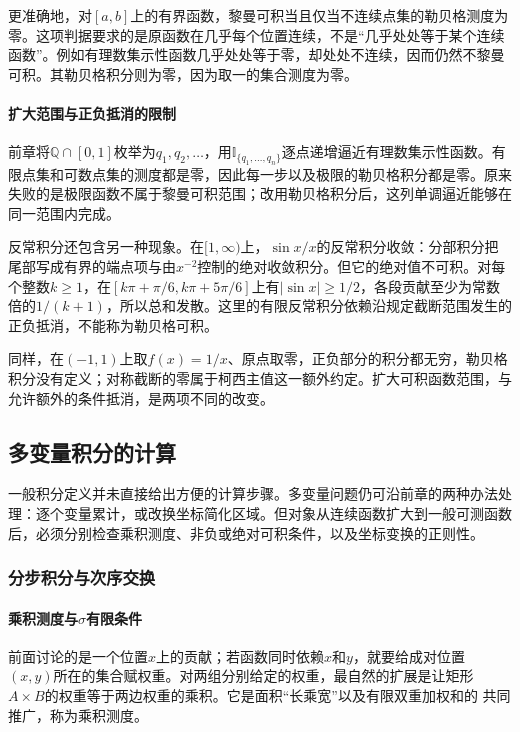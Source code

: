 更准确地，对$[a,b]$上的有界函数，黎曼可积当且仅当不连续点集的勒贝格测度为零。这项判据要求的是原函数在几乎每个位置连续，不是“几乎处处等于某个连续函数”。例如有理数集示性函数几乎处处等于零，却处处不连续，因而仍然不黎曼可积。其勒贝格积分则为零，因为取一的集合测度为零。

\paragraph{扩大范围与正负抵消的限制}

前章将$\mathbb Q\cap[0,1]$枚举为$q_1,q_2,\ldots$，用$\mathbb I_{\{q_1,\ldots,q_n\}}$逐点递增逼近有理数集示性函数。有限点集和可数点集的测度都是零，因此每一步以及极限的勒贝格积分都是零。原来失败的是极限函数不属于黎曼可积范围；改用勒贝格积分后，这列单调逼近能够在同一范围内完成。

反常积分还包含另一种现象。在$[1,\infty)$上，$\sin x/x$的反常积分收敛：分部积分把尾部写成有界的端点项与由$x^{-2}$控制的绝对收敛积分。但它的绝对值不可积。对每个整数$k\geq1$，在$[k\pi+\pi/6,k\pi+5\pi/6]$上有$|\sin x|\geq1/2$，各段贡献至少为常数倍的$1/(k+1)$，所以总和发散。这里的有限反常积分依赖沿规定截断范围发生的正负抵消，不能称为勒贝格可积。

同样，在$(-1,1)$上取$f(x)=1/x$、原点取零，正负部分的积分都无穷，勒贝格积分没有定义；对称截断的零属于柯西主值这一额外约定。扩大可积函数范围，与允许额外的条件抵消，是两项不同的改变。

\subsection{多变量积分的计算}

一般积分定义并未直接给出方便的计算步骤。多变量问题仍可沿前章的两种办法处理：逐个变量累计，或改换坐标简化区域。但对象从连续函数扩大到一般可测函数后，必须分别检查乘积测度、非负或绝对可积条件，以及坐标变换的正则性。

\subsubsection{分步积分与次序交换}
\paragraph{乘积测度与$\sigma$有限条件}

前面讨论的是一个位置$x$上的贡献；若函数同时依赖$x$和$y$，就要给成对位置
$(x,y)$所在的集合赋权重。对两组分别给定的权重，最自然的扩展是让矩形
$A\times B$的权重等于两边权重的乘积。它是面积“长乘宽”以及有限双重加权和的
共同推广，称为乘积测度。

